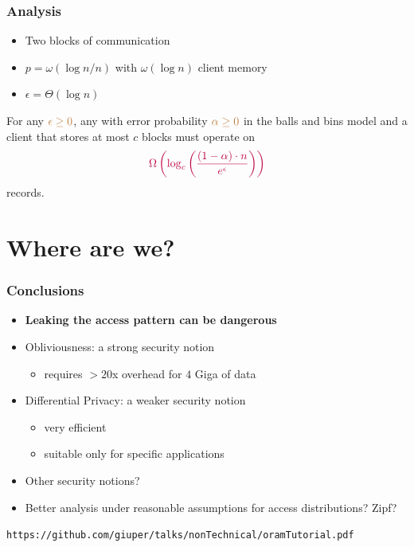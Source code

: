 \documentclass[]{beamer}
\begin{document}
\begin{frame}
\frametitle{Analysis}
\begin{itemize}[<+->]
\item Two blocks of communication
\item $p=\omega(\log n/n)$ with $\omega(\log n)$ client memory
\item $\epsilon=\Theta(\log n)$
\end{itemize}


\pause

\begin{theorem}
For any $\color{brown}\epsilon \ge 0$, any {} with error probability $\color{brown}\alpha \ge 0$
in the balls and bins model and a client that stores at most $c$ blocks must operate on
$$\color{purple}
\Omega\left(\log_c \left(\frac{(1-\alpha) \cdot n}{e^\epsilon}\right)\right)
$$
records.
\end{theorem}

\end{frame}

\section{Where are we?}
\begin{frame}
\frametitle{Conclusions}
\begin{itemize}[<+->]
\item{\color{blue} \bf Leaking the access pattern can be dangerous}
\item {\color{purple} Obliviousness}: a strong security notion
\begin{itemize}
    \item {\color{brown} requires $>20$x overhead for $4$ Giga of data}
\end{itemize}
\item {\color{purple} Differential Privacy}: a weaker security notion
\begin{itemize}
    \item {\color{brown} very efficient }
    \item {\color{brown} suitable only for specific applications}
\end{itemize}
\item Other security notions?
\item Better analysis under reasonable assumptions for access distributions?
Zipf?

\end{itemize}
\pause

\pause
{\small 
{\tt{https://github.com/giuper/talks/nonTechnical/oramTutorial.pdf}}
}
\end{frame}
\end{document}
